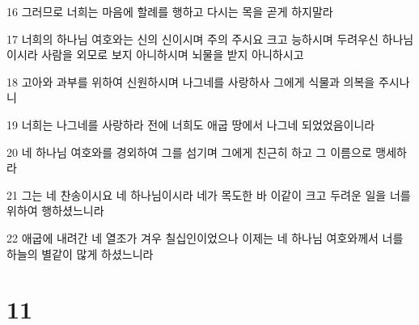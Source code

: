 \par 16 그러므로 너희는 마음에 할례를 행하고 다시는 목을 곧게 하지말라
\par 17 너희의 하나님 여호와는 신의 신이시며 주의 주시요 크고 능하시며 두려우신 하나님 이시라 사람을 외모로 보지 아니하시며 뇌물을 받지 아니하시고
\par 18 고아와 과부를 위하여 신원하시며 나그네를 사랑하사 그에게 식물과 의복을 주시나니
\par 19 너희는 나그네를 사랑하라 전에 너희도 애굽 땅에서 나그네 되었었음이니라
\par 20 네 하나님 여호와를 경외하여 그를 섬기며 그에게 친근히 하고 그 이름으로 맹세하라
\par 21 그는 네 찬송이시요 네 하나님이시라 네가 목도한 바 이같이 크고 두려운 일을 너를 위하여 행하셨느니라
\par 22 애굽에 내려간 네 열조가 겨우 칠십인이었으나 이제는 네 하나님 여호와께서 너를 하늘의 별같이 많게 하셨느니라

\chapter{11}

